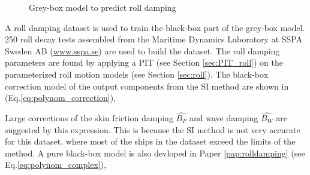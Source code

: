 \begin{figure}[H]
    
    \centering
    \caption{Grey-box model to predict roll damping}
    \label{fig:greyrolldamping}
\end{figure}

\noindent A roll damping dataset is used to train the black-box part of the grey-box model.
250 roll decay tests assembled from the Maritime Dynamics Laboratory at SSPA Sweden AB (\href{www.sspa.se}{www.sspa.se}) are used to build the dataset. The roll damping parameters are found by applying a PIT (see Section \ref{sec:PIT_roll}) on the parameterized roll motion models (see Section \ref{sec:roll}).
The black-box correction model of the output components from the SI method are shown in (Eq.\ref{eq:polynom_correction}),


\noindent Large corrections of the skin friction damping $\hat{B_F}$ and wave damping $\hat{B_W}$ are suggested by this expression. This is because the SI method is not very accurate for this dataset, where most of the ships in the dataset exceed the limits of the method. A pure black-box model is also devloped in Paper \ref{pap:rolldamping} (see Eq.\ref{eq:polynom_complex}),


